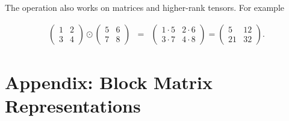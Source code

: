 The operation also works on matrices and higher-rank tensors. For example

\begin{eqnarray}
\begin{pmatrix} 1 & 2 \\ 3 & 4 \end{pmatrix} \odot \begin{pmatrix} 5 & 6 \\ 7 & 8 \end{pmatrix} &=& \begin{pmatrix} 1 \cdot 5 & 2 \cdot 6 \\ 3 \cdot 7 & 4 \cdot 8 \end{pmatrix} = \begin{pmatrix} 5 & 12 \\ 21 & 32 \end{pmatrix}.
\end{eqnarray}


\section{Appendix: Block Matrix Representations}

